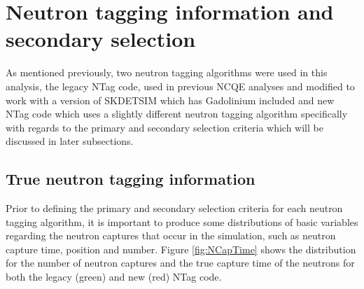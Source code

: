 \section{Neutron tagging information and secondary selection}

As mentioned previously, two neutron tagging algorithms were used in this analysis, the legacy NTag code, used in previous NCQE analyses and modified to work with a version of SKDETSIM which has Gadolinium included and new NTag code which uses a slightly different neutron tagging algorithm specifically with regards to the primary and secondary selection criteria which will be discussed in later subsections.



\subsection{True neutron tagging information}

Prior to defining the primary and secondary selection criteria for each neutron tagging algorithm, it is important to produce some distributions of basic variables regarding the neutron captures that occur in the simulation, such as neutron capture time, position and number. Figure \ref{fig:NCapTime} shows the distribution for the number of neutron captures and the true capture time of the neutrons for both the legacy (green) and new (red) NTag code.  

